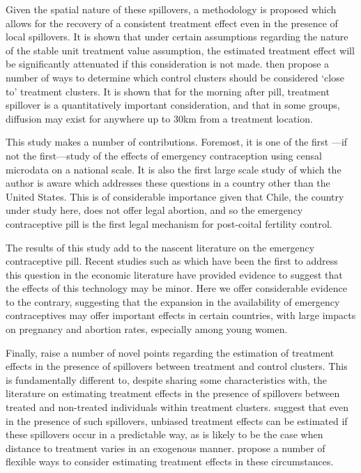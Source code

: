 Given the spatial nature of these spillovers, a methodology is proposed which
allows for the recovery of a consistent treatment effect even in the presence
of local spillovers.  It is shown that under certain assumptions regarding the
nature of the stable unit treatment value assumption, the estimated treatment 
effect will be significantly attenuated if this consideration is not made.
\Person then propose a number of ways to determine which control clusters should
be considered `close to' treatment clusters.  It is shown that for the morning
after pill, treatment spillover is a quantitatively important consideration,
and that in some groups, diffusion may exist for anywhere up to 30km from a
treatment location.

This study makes a number of contributions.  Foremost, it is one of the first%
---if not the first---study of the effects of emergency contraception using 
censal microdata on a national scale.  It is also the first large scale study 
of which the author is aware which addresses these questions in a country other 
than the United States.  This is of considerable importance given that Chile, 
the country under study here, does not offer legal abortion, and so the 
emergency contraceptive pill is the first legal mechanism for post-coital 
fertility control.

The results of this study add to the nascent literature on the emergency 
contraceptive pill.  Recent studies such as \citet{Grossetal2012, Durrance2013} 
which have been the first to address this question in the economic literature
have provided evidence to suggest that the effects of this technology may be 
minor.  Here we offer considerable evidence to the contrary, suggesting
that the expansion in the availability of emergency contraceptives may offer 
important effects in certain countries, with large impacts on pregnancy and 
abortion rates, especially among young women.

Finally, \person raise a number of novel points regarding the estimation of 
treatment effects in the presence of spillovers between treatment and control
clusters.  This is fundamentally different to, despite sharing some 
characteristics with, the literature on estimating treatment effects in the 
presence of spillovers between treated and non-treated individuals within 
treatment clusters.  \Person suggest that even in the presence of such 
spillovers, unbiased treatment effects can be estimated if these spillovers
occur in a predictable way, as is likely to be the case when distance to 
treatment varies in an exogenous manner. \Person propose a number of flexible
ways to consider estimating treatment effects in these circumstances.

